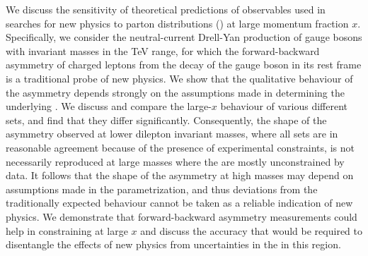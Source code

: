 We discuss the sensitivity of theoretical predictions of observables used in
searches for new physics to parton
distributions (\pdfs) at large momentum fraction $x$.
%
Specifically, we consider the neutral-current Drell-Yan production of
gauge bosons with invariant masses in the TeV range, for which    
the forward-backward asymmetry of charged leptons
from the decay of the gauge boson in its rest frame is a traditional
probe of new physics. We show that the qualitative  behaviour of the asymmetry 
depends strongly on the assumptions made in determining the underlying \pdfs.
%
 We discuss and compare the large-$x$
 behaviour of various different \pdf sets, and find that they 
 differ significantly.
 Consequently, the shape of the asymmetry observed at lower
 dilepton invariant masses, where all \pdf sets are in reasonable agreement 
because of  the presence of experimental constraints,
 is not necessarily reproduced at large masses where the
 \pdfs are mostly unconstrained by data.
%
 It follows that the shape 
of the asymmetry at high masses may depend on 
assumptions made in the \pdf parametrization, 
and thus deviations from the traditionally expected behaviour cannot be taken as a reliable 
indication of new physics.
%
We demonstrate that forward-backward asymmetry measurements
could help in constraining \pdfs at large $x$ and discuss the accuracy that would be required to
disentangle the effects of new physics from uncertainties in the \pdfs in this region.
